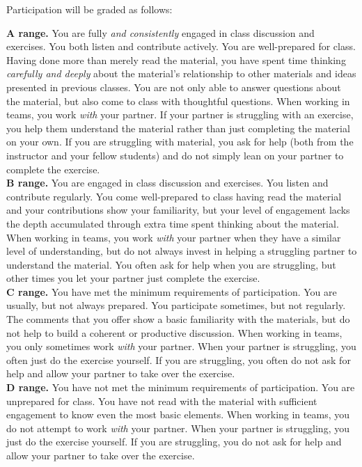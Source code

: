 \documentclass[12pt]{article}
\begin{document}
Participation will be graded as follows:

\textbf{A range.}  You are fully \emph{and consistently} engaged in class discussion and exercises.  You both listen and contribute actively.  You are well-prepared for class.  Having done more than merely read the material, you have spent time thinking \emph{carefully and deeply} about the material's relationship to other materials and ideas presented in previous classes. You are not only able to answer questions about the material, but also come to class with thoughtful questions.  When working in teams, you work \emph{with} your partner. If your partner is struggling with an exercise, you help them understand the material rather than just completing the material on your own. If you are struggling with material, you ask for help (both from the instructor and your fellow students) and do not simply lean on your partner to complete the exercise. \\

\textbf{B range.}  You are engaged in class discussion and exercises.  You listen and contribute regularly.  You come well-prepared to class having read the material and your contributions show your familiarity, but your level of engagement lacks the depth accumulated through extra time spent thinking about the material.  When working in teams, you work \emph{with} your partner when they have a similar level of understanding, but do not always invest in helping a struggling partner to understand the material. You often ask for help when you are struggling, but other times you let your partner just complete the exercise. \\

\textbf{C range.}  You have met the minimum requirements of participation.  You are usually, but not always prepared.  You participate sometimes, but not regularly.  The comments that you offer show a basic familiarity with the materials, but do not help to build a coherent or productive discussion.  When working in teams, you only sometimes work \emph{with} your partner. When your partner is struggling, you often just do the exercise yourself. If you are struggling, you often do not ask for help and allow your partner to take over the exercise. \\

\textbf{D range.}  You have not met the minimum requirements of participation.  You are unprepared for class.  You have not read with the material with sufficient engagement to know even the most basic elements.  When working in teams, you do not attempt to work \emph{with} your partner. When your partner is struggling, you just do the exercise yourself. If you are struggling, you do not ask for help and allow your partner to take over the exercise.\\
\end{document}
